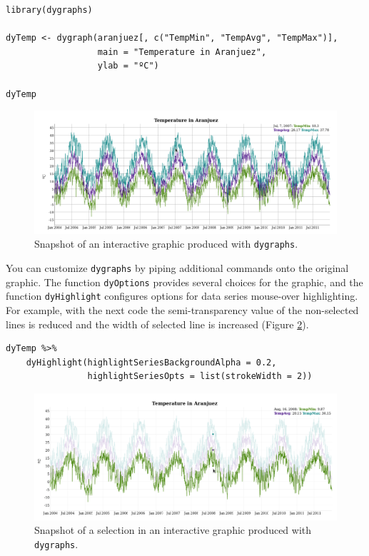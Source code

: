 \documentclass[smallroyalvopaper]{memoir}
\begin{document}

\lstset{language=r,label= ,caption= ,captionpos=b,numbers=none}
\begin{lstlisting}
library(dygraphs)

dyTemp <- dygraph(aranjuez[, c("TempMin", "TempAvg", "TempMax")],
                  main = "Temperature in Aranjuez",
                  ylab = "ºC")

dyTemp
\end{lstlisting}

\begin{figure}[htbp]
\centering
\includegraphics[width=.9\linewidth]{figs/dygraphs_aranjuez.png}
\caption{Snapshot of an interactive graphic produced with \texttt{dygraphs}. \label{fig:dygraphs}}
\end{figure}



You can customize \texttt{dygraphs} by piping additional commands onto the original graphic.  The function \texttt{dyOptions} provides several choices for the graphic, and the function \texttt{dyHighlight} configures options for data series mouse-over highlighting. For example, with the next code the semi-transparency value of the non-selected lines is reduced and the width of selected line is increased (Figure \ref{fig:dygraphs_selected}).

\lstset{language=r,label= ,caption= ,captionpos=b,numbers=none}
\begin{lstlisting}
dyTemp %>%
    dyHighlight(highlightSeriesBackgroundAlpha = 0.2,
                highlightSeriesOpts = list(strokeWidth = 2))
\end{lstlisting}

\begin{figure}[htbp]
\centering
\includegraphics[width=.9\linewidth]{figs/dygraphs_aranjuez_selected.png}
\caption{Snapshot of a selection in an interactive graphic produced with \texttt{dygraphs}. \label{fig:dygraphs_selected}}
\end{figure}
\end{document}
